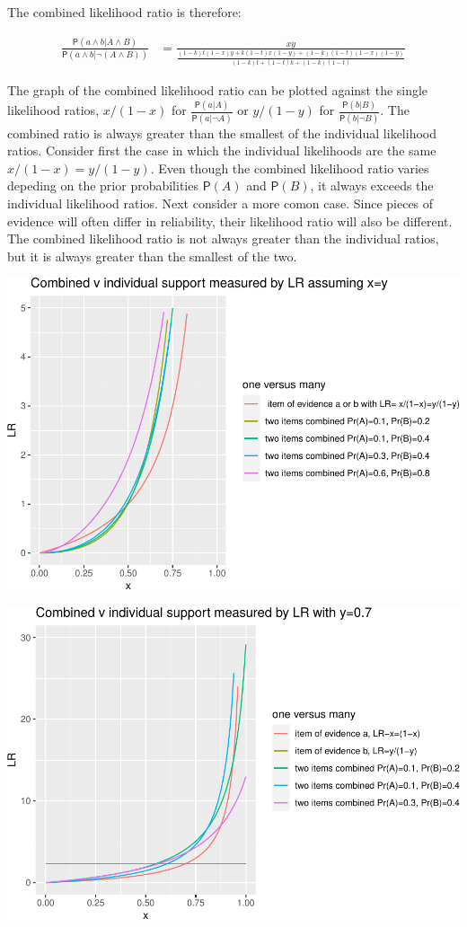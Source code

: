 \documentclass[10pt,dvipsnames,enabledeprecatedfontcommands]{scrartcl}
\newcommand{\et}{\wedge}
\newcommand{\pr}[1]{\mathsf{P}(#1)}
\begin{document}
\noindent
The combined likelihood ratio is therefore:

\begin{align*}
\frac{\pr{ a \et b |A \et B}}{\pr{a \et b | \neg (A \et B)}} & = \frac{xy}{\frac{(1-k)t(1-x)y + k(1-t)x(1-y) + (1-k)(1-t)(1-x)(1-y)}{ \left(1-k\right) t +\left(1-t\right) k+\left(1-k\right) \left(1-t\right) }}
 \end{align*}

\noindent
The graph of the combined likelihood ratio can be plotted against the
single likelihood ratios, \(x/(1-x)\) for
\(\frac{\pr{a |A}}{\pr{a | \neg A}}\) or \(y/(1-y)\) for
\(\frac{\pr{b |B}}{\pr{b | \neg B}}\). The combined ratio is always
greater than the smallest of the individual likelihood ratios. Consider
first the case in which the individual likelihoods are the same
\(x/(1-x)=y/(1-y)\). Even though the combined likelihood ratio varies
depeding on the prior probabilities \(\pr{A}\) and \(\pr{B}\), it always
exceeds the individual likelihood ratios. Next consider a more comon
case. Since pieces of evidence will often differ in reliability, their
likelihood ratio will also be different. The combined likelihood ratio
is not always greater than the individual ratios, but it is always
greater than the smallest of the two.

\vspace{3mm}
\includegraphics{burden-proof2_files/figure-latex/unnamed-chunk-1-1.pdf}

\includegraphics{burden-proof2_files/figure-latex/unnamed-chunk-2-1.pdf}
\end{document}
